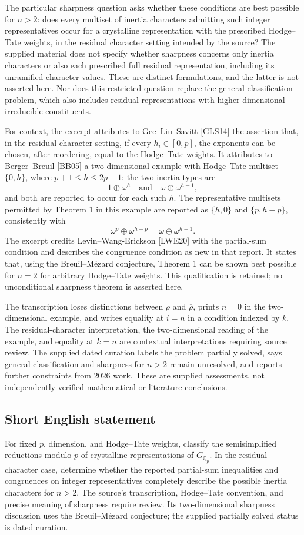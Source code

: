 \documentclass[11pt]{article}
\newcommand{\Q}{\mathbb{Q}}
\begin{document}
The particular sharpness question asks whether these conditions are best possible for \(n>2\): does every multiset of inertia characters admitting such integer representatives occur for a crystalline representation with the prescribed Hodge--Tate weights, in the residual character setting intended by the source? The supplied material does not specify whether sharpness concerns only inertia characters or also each prescribed full residual representation, including its unramified character values. These are distinct formulations, and the latter is not asserted here. Nor does this restricted question replace the general classification problem, which also includes residual representations with higher-dimensional irreducible constituents.

For context, the excerpt attributes to Gee--Liu--Savitt [GLS14] the assertion that, in the residual character setting, if every \(h_i\in[0,p]\), the exponents can be chosen, after reordering, equal to the Hodge--Tate weights. It attributes to Berger--Breuil [BB05] a two-dimensional example with Hodge--Tate multiset \(\{0,h\}\), where \(p+1\leq h\leq 2p-1\): the two inertia types are
\[
1\oplus\omega^h\quad\text{and}\quad\omega\oplus\omega^{h-1},
\]
and both are reported to occur for each such \(h\). The representative multisets permitted by Theorem 1 in this example are reported as \(\{h,0\}\) and \(\{p,h-p\}\), consistently with
\[
\omega^p\oplus\omega^{h-p}=\omega\oplus\omega^{h-1}.
\]
The excerpt credits Levin--Wang-Erickson [LWE20] with the partial-sum condition and describes the congruence condition as new in that report. It states that, using the Breuil--M\'ezard conjecture, Theorem 1 can be shown best possible for \(n=2\) for arbitrary Hodge--Tate weights. This qualification is retained; no unconditional sharpness theorem is asserted here.

The transcription loses distinctions between \(\rho\) and \(\overline\rho\), prints \(n=0\) in the two-dimensional example, and writes equality at \(i=n\) in a condition indexed by \(k\). The residual-character interpretation, the two-dimensional reading of the example, and equality at \(k=n\) are contextual interpretations requiring source review. The supplied dated curation labels the problem partially solved, says general classification and sharpness for \(n>2\) remain unresolved, and reports further constraints from 2026 work. These are supplied assessments, not independently verified mathematical or literature conclusions.
\subsection{Short English statement}
For fixed \(p\), dimension, and Hodge--Tate weights, classify the semisimplified reductions modulo \(p\) of crystalline representations of \(G_{\Q_p}\). In the residual character case, determine whether the reported partial-sum inequalities and congruences on integer representatives completely describe the possible inertia characters for \(n>2\). The source's transcription, Hodge--Tate convention, and precise meaning of sharpness require review. Its two-dimensional sharpness discussion uses the Breuil--M\'ezard conjecture; the supplied partially solved status is dated curation.
\end{document}
